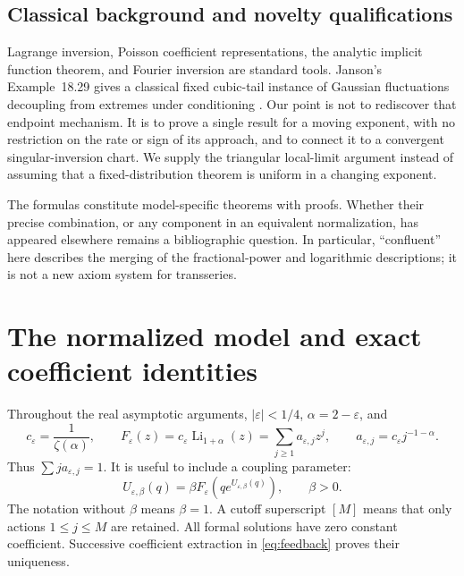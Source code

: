 \documentclass[11pt,a4paper]{article}
\numberwithin{equation}{section}
\theoremstyle{definition}
\theoremstyle{remark}
\newcommand{\eps}{\varepsilon}
\DeclareMathOperator{\Li}{Li}
\begin{document}
\subsection{Classical background and novelty qualifications}
Lagrange inversion, Poisson coefficient representations, the analytic implicit
function theorem, and Fourier inversion are standard tools. Janson's
Example~18.29 gives a classical fixed cubic-tail instance of Gaussian
fluctuations decoupling from extremes under conditioning \cite{janson}.
Our point is not to rediscover that endpoint mechanism. It is to prove a
single result for a moving exponent, with no restriction on the rate or sign
of its approach, and to connect it to a convergent singular-inversion chart.
We supply the triangular local-limit argument instead of assuming that a
fixed-distribution theorem is uniform in a changing exponent.

The formulas constitute model-specific theorems with proofs. Whether their
precise combination, or any component in an equivalent normalization, has
appeared elsewhere remains a bibliographic question. In particular,
``confluent'' here describes the merging of the fractional-power and
logarithmic descriptions; it is not a new axiom system for transseries.

\section{The normalized model and exact coefficient identities}
\label{sec:model}
Throughout the real asymptotic arguments, \(|\eps|<1/4\),
\(\alpha=2-\eps\), and
\begin{equation}
 c_\eps=\frac1{\zeta(\alpha)},\qquad
 F_\eps(z)=c_\eps\Li_{1+\alpha}(z)
 =\sum_{j\ge1}a_{\eps,j}z^j,\qquad
 a_{\eps,j}=c_\eps j^{-1-\alpha}.
 \label{eq:model}
\end{equation}
Thus \(\sum j a_{\eps,j}=1\). It is useful to include a coupling parameter:
\begin{equation}
 U_{\eps,\beta}(q)=\beta F_\eps(qe^{U_{\eps,\beta}(q)}),
 \qquad \beta>0.
 \label{eq:feedback}
\end{equation}
The notation without \(\beta\) means \(\beta=1\). A cutoff superscript
\([M]\) means that only actions \(1\le j\le M\) are retained. All formal
solutions have zero constant coefficient. Successive coefficient extraction
in \eqref{eq:feedback} proves their uniqueness.
\end{document}
